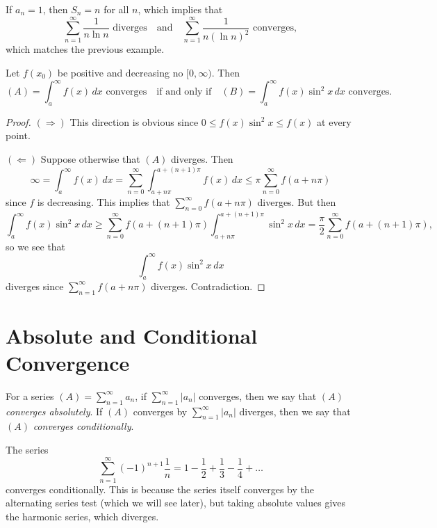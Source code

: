 \begin{remark}
  If $a_n = 1$, then $S_n = n$ for all $n$, which implies
  that
  \[
    \sum_{n = 1}^\infty \frac{1}{n \ln n} \text{ diverges}
    \quad \text{and} \quad
    \sum_{n = 1}^\infty \frac{1}{n (\ln n)^2} \text{ converges},
  \]
  which matches the previous example.
\end{remark}

\begin{example}
  Let $f(x_0)$ be positive and decreasing no
  $[0, \infty)$. Then
  \[
    (A) = \int_a^\infty f(x)\, dx \text{ converges} \quad
  \text{if and only if} \quad
  (B) = \int_a^\infty f(x) \sin^2 x\, dx \text{ converges}.
  \]
\end{example}

\begin{proof}
  $(\Rightarrow)$ This direction is obvious since
  $0 \le f(x) \sin^2 x \le f(x)$ at every point.

  $(\Leftarrow)$ Suppose otherwise that $(A)$ diverges. Then
  \[
    \infty = \int_a^\infty f(x)\, dx
    = \sum_{n = 0}^\infty \int_{a + n\pi}^{a + (n + 1)\pi}
    f(x)\, dx
    \le \pi \sum_{n = 0}^\infty f(a + n\pi)
  \]
  since $f$ is decreasing. This implies that
  $\sum_{n = 0}^\infty f(a + n\pi)$ diverges. But then
  \[
    \int_a^\infty f(x) \sin^2 x\, dx
    \ge \sum_{n = 0}^\infty f(a + (n + 1)\pi) \int_{a + n\pi}^{a + (n + 1)\pi} \sin^2 x\, dx
    = \frac{\pi}{2}\sum_{n = 0}^\infty f(a + (n + 1)\pi),
  \]
  so we see that
  \[
    \int_a^\infty f(x) \sin^2 x\, dx
  \]
  diverges since $\sum_{n = 1}^\infty f(a + n\pi)$ diverges. Contradiction.
\end{proof}

\section{Absolute and Conditional Convergence}

\begin{definition}
  For a series $(A) = \sum_{n = 1}^\infty a_n$, if
  $\sum_{n = 1}^\infty |a_n|$ converges, then we say that
  $(A)$ \emph{converges absolutely}. If $(A)$ converges
  by $\sum_{n = 1}^\infty |a_n|$ diverges, then we say
  that $(A)$ \emph{converges conditionally}.
\end{definition}

\begin{example}
  The series
  \[
    \sum_{n = 1}^\infty (-1)^{n + 1} \frac{1}{n}
    = 1 - \frac{1}{2} + \frac{1}{3} - \frac{1}{4} + \dots
  \]
  converges conditionally. This is because the series
  itself converges by the alternating series test (which
  we will see later), but
  taking absolute values gives the harmonic series,
  which diverges.
\end{example}

